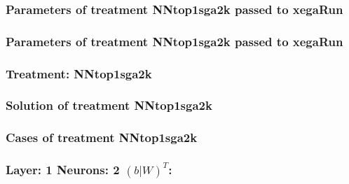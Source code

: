 \documentclass[18pt,c]{beamer}
\begin{document}
 \begin{frame}
 \fontsize{8pt}{9pt}\selectfont
 \frametitle{  Parameters of treatment NNtop1sga2k passed to xegaRun
 }

 \label{ExpDtParmTable001.tex}  
 \end{frame}


 \begin{frame}
 \fontsize{8pt}{9pt}\selectfont
 \frametitle{  Parameters of treatment NNtop1sga2k passed to xegaRun
 }

 \label{ExpDtParmTable002.tex}  
 \end{frame}

 \begin{frame}
 \fontsize{8pt}{9pt}\selectfont
 \frametitle{ Treatment: NNtop1sga2k }

 \label{ExpDStatsTable003.tex}  
 \end{frame}

 \begin{frame}
 \fontsize{8pt}{9pt}\selectfont
 \frametitle{ Solution of treatment NNtop1sga2k }

 \label{ExpDSolutionTable000.tex}  
 \end{frame}

 \begin{frame}
 \fontsize{8pt}{9pt}\selectfont
 \frametitle{ Cases of treatment NNtop1sga2k }

 \label{ExpDSolutionTable001.tex}  
 \end{frame}


 \begin{frame}
 \fontsize{8pt}{9pt}\selectfont
 \frametitle{ Layer: 1 Neurons: 2  $(b|W)^T$: 
 }

 \label{ExpDNNWeightTable000.tex}  
 \end{frame}
\end{document}
